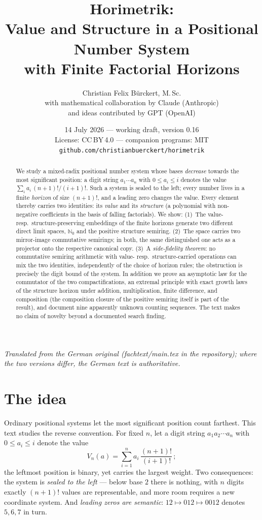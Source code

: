 \documentclass[11pt]{article}
\title{Horimetrik:\\
Value and Structure in a Positional Number System\\
with Finite Factorial Horizons}
\author{Christian Felix Bürckert, M.\,Sc.\\[2pt]
\normalsize with mathematical collaboration by Claude (Anthropic)\\
\normalsize and ideas contributed by GPT (OpenAI)}
\date{14 July 2026 --- working draft, version 0.16\\[4pt]
\normalsize License: CC\,BY\,4.0 --- companion programs: MIT\\
\normalsize\texttt{github.com/christianbuerckert/horimetrik}}
\theoremstyle{definition}
\theoremstyle{remark}
\newcommand{\NN}{\mathbb N_0}
\begin{document}
\maketitle

\noindent\emph{Translated from the German original (fachtext/main.tex
in the repository); where the two versions differ, the German text is
authoritative.}\bigskip

\begin{abstract}
We study a mixed-radix positional number system whose bases
\emph{decrease} towards the most significant position: a digit
string $a_1\cdots a_n$ with $0\le a_i\le i$ denotes the value
$\sum_i a_i\,(n+1)!/(i+1)!$. Such a system is sealed to the left;
every number lives in a finite \emph{horizon} of size $(n+1)!$, and
a leading zero changes the value. Every element thereby carries two
identities: its \emph{value} and its \emph{structure} (a polynomial
with non-negative coefficients in the basis of falling factorials).
We show: (1)~The value- resp.\ structure-preserving embeddings of
the finite horizons generate two different direct limit spaces,
$\NN$ and the positive structure semiring. (2)~The space carries two
mirror-image commutative semirings; in both, the same distinguished
one acts as a projector onto the respective canonical copy. (3)~A
\emph{side-fidelity theorem}: no commutative semiring arithmetic
with value- resp.\ structure-carried operations can mix the two
identities, independently of the choice of horizon rules; the
obstruction is precisely the digit bound of the system. In addition
we prove an asymptotic law for the commutator of the two
compactifications, an extremal principle with exact growth laws of
the structure horizon under addition, multiplication, finite
difference, and composition (the composition closure of the
positive semiring itself is part of the result), and document nine
apparently unknown counting sequences. The text makes no claim of
novelty beyond a documented search finding.
\end{abstract}

\section{The idea}

Ordinary positional systems let the most significant position count
farthest. This text studies the reverse convention. For fixed $n$,
let a digit string $a_1a_2\cdots a_n$ with $0\le a_i\le i$ denote
the value
\[
V_n(a)=\sum_{i=1}^n a_i\,\frac{(n+1)!}{(i+1)!}\,;
\]
the leftmost position is binary, yet carries the largest weight.
Two consequences: the system is \emph{sealed to the left} --- below
base $2$ there is nothing, with $n$ digits exactly $(n+1)!$ values
are representable, and more room requires a new coordinate system.
And \emph{leading zeros are semantic}: $12\mapsto012\mapsto0012$
denotes $5,6,7$ in turn.
\end{document}
